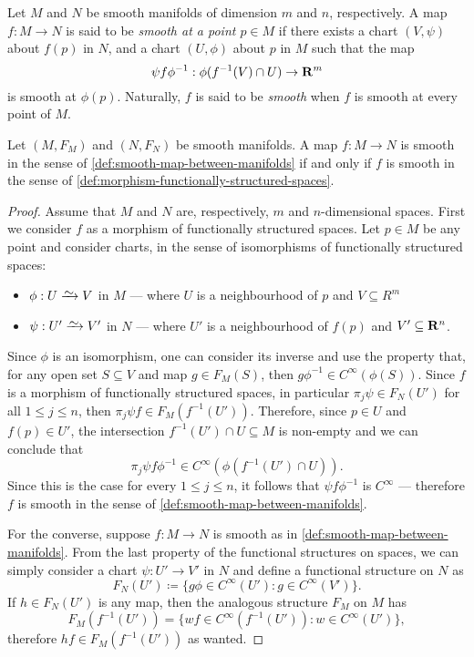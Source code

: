\begin{definition}
\label{def:smooth-map-between-manifolds}
Let \(M\) and \(N\) be smooth manifolds of dimension \(m\) and \(n\),
respectively. A map\(f: M \to N\) is said to be \emph{smooth at a point
  \(p \in M\)} if there exists a chart \((V, \psi)\) about \(f(p)\) in \(N\),
and a chart \((U, \phi)\) about \(p\) in \(M\) such that the map
\[
\psi f \phi^{-1}: \phi(f^{-1}(V) \cap U) \to \mathbf{R}^m
\]
is smooth at \(\phi(p)\). Naturally, \(f\) is said to be \emph{smooth} when
\(f\) is smooth at every point of \(M\).
\end{definition}

\begin{lemma}
\label{lem:equiv-smooth-map-definition}
Let \((M, F_M)\) and \((N, F_N)\) be smooth manifolds. A map \(f: M \to N\) is
smooth in the sense of \cref{def:smooth-map-between-manifolds} if and only if
\(f\) is smooth in the sense of
\cref{def:morphism-functionally-structured-spaces}.
\end{lemma}

\begin{proof}
Assume that \(M\) and \(N\) are, respectively, \(m\) and \(n\)-dimensional
spaces. First we consider \(f\) as a morphism of functionally structured spaces.
Let \(p \in M\) be any point and consider charts, in the sense of isomorphisms
of functionally structured spaces:
\begin{itemize}\setlength\itemsep{0em}
\item \(\phi: U \isoto V\) in \(M\) --- where \(U\) is a neighbourhood of \(p\)
  and \(V \subseteq R^m\)

\item \(\psi: U' \isoto V'\) in \(N\) --- where \(U'\) is a neighbourhood of
  \(f(p)\) and \(V' \subseteq \mathbf{R}^n\).
\end{itemize}
Since \(\phi\) is an isomorphism, one can consider its inverse and use the
property that, for any open set \(S \subseteq V\) and map \(g \in F_M(S)\), then
\(g \phi^{-1} \in C^{\infty}(\phi(S))\). Since \(f\) is a morphism of functionally
structured spaces, in particular \(\pi_j \psi \in F_N(U')\) for all \(1 \leq j
\leq n\), then \(\pi_j \psi f \in F_M(f^{-1}(U'))\). Therefore, since \(p \in
U\) and \(f(p) \in U'\), the intersection \(f^{-1}(U') \cap U \subseteq M\) is
non-empty and we can conclude that
\[
\pi_j \psi f \phi^{-1} \in C^{\infty}(\phi(f^{-1}(U') \cap U)).
\]
Since this is the case for every \(1 \leq j \leq n\), it follows that
\(\psi f \phi^{-1}\) is \(C^{\infty}\) --- therefore \(f\) is smooth in the
sense of \cref{def:smooth-map-between-manifolds}.

For the converse, suppose \(f: M \to N\) is smooth as in
\cref{def:smooth-map-between-manifolds}. From the last property of the
functional structures on spaces, we can simply consider a chart \(\psi: U' \to
V'\) in \(N\) and define a functional structure on \(N\) as
\[
F_N(U') \coloneq \{g \phi \in C^{\infty}(U') \colon g \in C^{\infty}(V')\}.
\]
If \(h \in F_N(U')\) is any map, then the analogous structure \(F_M\) on \(M\)
has
\[
F_M(f^{-1}(U')) = \{w f \in C^{\infty}(f^{-1}(U')) \colon w \in C^{\infty}(U')\},
\]
therefore \(h f \in F_M(f^{-1}(U'))\) as wanted.
\end{proof}

